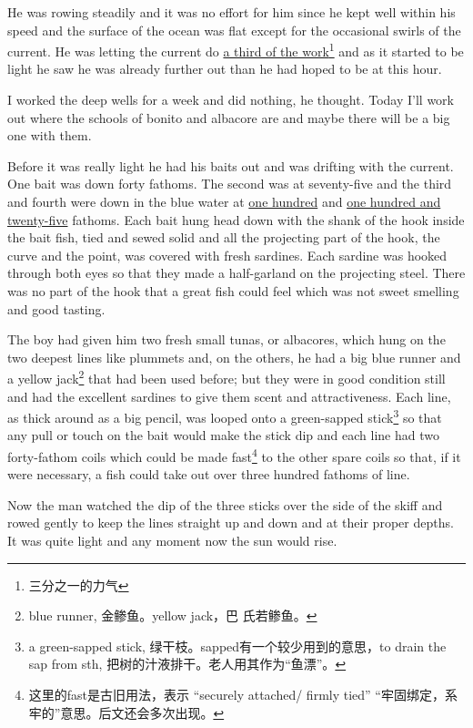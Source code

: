 \documentclass[fontset=ubuntu,zihao=-4]{ctexrep}
\begin{document}
He was rowing \gls{steadily} and it was no \gls{effort} for him since he kept well
within his speed and the surface of the ocean was flat except for the
\gls{occasional} swirls of the current. He was letting the current do \uline{a third of
the work}\footnote{三分之一的力气} and as it started to be light he saw he was already further out
than he had hoped to be at this hour.

I worked the deep wells for a week and did nothing, he thought. Today I'll
work out where the schools of \gls{bonito} and \gls{albacore} are and maybe
there will be a big one with them.

Before it was really light he had his baits out and was \gls{drifting} with
the current. One bait was down forty fathoms. The second was at seventy-five
and the third and fourth were down in the blue water at \uline{one hundred}
and \uline{one hundred and twenty-five} fathoms. Each bait \gls{hung} head
down with the \gls{shank} of the hook inside the bait fish, \gls{tied} and
\gls{sewed} \gls{solid} and all the \gls{projecting} part of the hook, the
\gls{curve} and the point, was covered with fresh sardines. Each sardine was
hooked through both eyes so that they made a half-\gls{garland} on the
projecting \gls{steel}. There was no part of the hook that a great fish
could feel which was not sweet smelling and good tasting.

The boy had given him two fresh small tunas, or albacores, which hung on the
two deepest lines like \glspl{plummet} and, on the others, he had a big blue
\gls{runner} and a yellow jack\footnote{blue runner, 金鲹鱼。yellow jack，巴
  氏若鲹鱼。} that had been used before; but they were in good
\gls{condition} still and had the \gls{excellent} sardines to give them
\gls{scent} and \gls{attractiveness}. Each line, as \gls{thick} around as a
big pencil, was looped onto a green-sapped \gls{stick}\footnote{a
  green-sapped stick, 绿干枝。sapped有一个较少用到的意思，to drain the sap
  from sth, 把树的汁液排干。老人用其作为“鱼漂”。} so that any pull or touch on
the bait would make the stick dip and each line had two forty-fathom coils
which could be made fast\footnote{这里的fast是古旧用法，表示 ``securely
  attached/ firmly tied'' “牢固绑定，系牢的”意思。后文还会多次出现。} to
the other \gls{spare} coils so that, if it were necessary, a fish could take
out over three hundred fathoms of line.

Now the man watched the dip of the three sticks over the side of the skiff
and rowed gently to keep the lines straight up and down and at their \gls{proper}
depths. It was quite light and any moment now the sun would rise.
\end{document}

